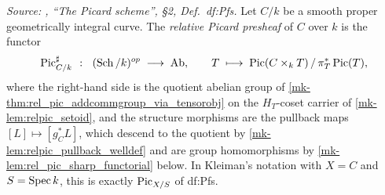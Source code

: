 \begin{definition}\label{mk-def:rel_pic_sharp}
  \leanok

  \textit{Source: \cite{kleiman-picard}, ``The Picard scheme'', \S 2,
  Def.~df:Pfs.}
  Let \(C/k\) be a smooth proper geometrically integral curve. The
  \emph{relative Picard presheaf} of \(C\) over \(k\) is the functor
  \[
    \operatorname{Pic}^\sharp_{C/k} \;\;\colon\;\; (\operatorname{Sch}/k)^{op} \;\longrightarrow\; \mathrm{Ab},
    \qquad
    T \;\longmapsto\; \operatorname{Pic}(C \times_k T) \,/\, \pi_T^*\operatorname{Pic}(T),
  \]
  where the right-hand side is the quotient abelian group of
  \ref{mk-thm:rel_pic_addcommgroup_via_tensorobj} on the \(H_T\)-coset
  carrier of \ref{mk-lem:relpic_setoid}, and the structure morphisms are the
  pullback maps \([L] \mapsto [g_C^* L]\), which descend to the quotient by
  \ref{mk-lem:relpic_pullback_welldef} and are group homomorphisms by
  \ref{mk-lem:rel_pic_sharp_functorial} below. In Kleiman's notation with
  \(X = C\) and \(S = \operatorname{Spec} k\), this is exactly \(\operatorname{Pic}_{X/S}\) of df:Pfs.
\end{definition}


